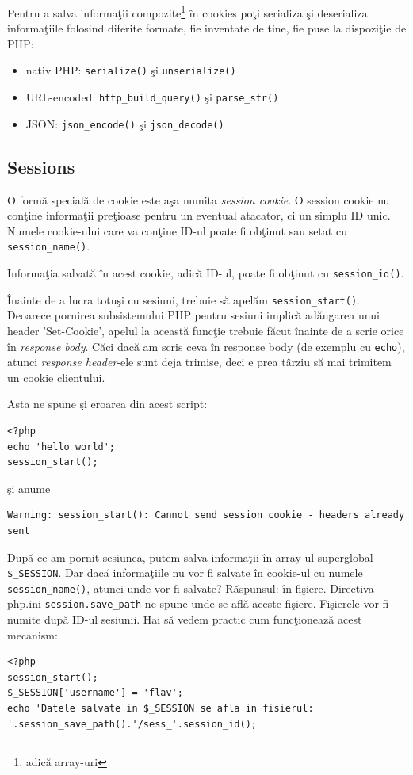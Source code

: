 Pentru a salva informaţii compozite\footnote{adică array-uri} \^in cookies
poţi serializa
şi deserializa informaţiile folosind diferite formate, fie inventate de tine,
fie puse la dispoziţie de PHP:
\begin{itemize}
 \item nativ PHP: \texttt{serialize()} şi \texttt{unserialize()}
 \item URL-encoded: \texttt{http\_build\_query()} şi \texttt{parse\_str()}
 \item JSON: \texttt{json\_encode()} şi \texttt{json\_decode()}
\end{itemize}


\subsection{Sessions}
O formă {\glqq}specială{\grqq} de cookie este aşa numita \textsl{session cookie}.
O session cookie nu conţine informaţii preţioase pentru un eventual atacator,
ci un simplu ID unic. Numele cookie-ului care va conţine ID-ul poate fi
obţinut sau setat cu \texttt{session\_name()}.

Informaţia salvată \^in acest cookie, adică ID-ul, poate fi obţinut cu
\texttt{session\_id()}.

\^Inainte de a lucra totuşi cu sesiuni, trebuie să apelăm \texttt{session\_start()}.
Deoarece pornirea subsistemului PHP pentru sesiuni implică adăugarea unui header
'Set-Cookie', apelul la această funcţie trebuie făcut \^inainte de a scrie orice
\^in \textit{response body}. Căci dacă am scris ceva \^in response body (de exemplu
cu \texttt{echo}), atunci \textit{response header}-ele sunt deja trimise, deci
e prea târziu să mai trimitem un cookie clientului.

Asta ne spune şi eroarea din acest script:
\begin{lstlisting}[title=Headers already sent]
<?php
echo 'hello world';
session_start();
\end{lstlisting}
şi anume
\begin{verbatim}
Warning: session_start(): Cannot send session cookie - headers already sent
\end{verbatim} 

După ce am pornit sesiunea, putem salva informaţii \^in array-ul superglobal
\texttt{\$\_SESSION}. Dar dacă informaţiile nu vor fi salvate \^in cookie-ul
cu numele \texttt{session\_name()}, atunci unde vor fi salvate? Răspunsul:
\^in fişiere. Directiva php.ini \texttt{session.save\_path} ne spune unde se află
aceste fişiere. Fişierele vor fi numite după ID-ul sesiunii. Hai să vedem practic
cum funcţionează acest mecanism:
\begin{lstlisting}[title=Understanding Sessions]
<?php
session_start();
$_SESSION['username'] = 'flav';
echo 'Datele salvate in $_SESSION se afla in fisierul: '.session_save_path().'/sess_'.session_id();
\end{lstlisting}

